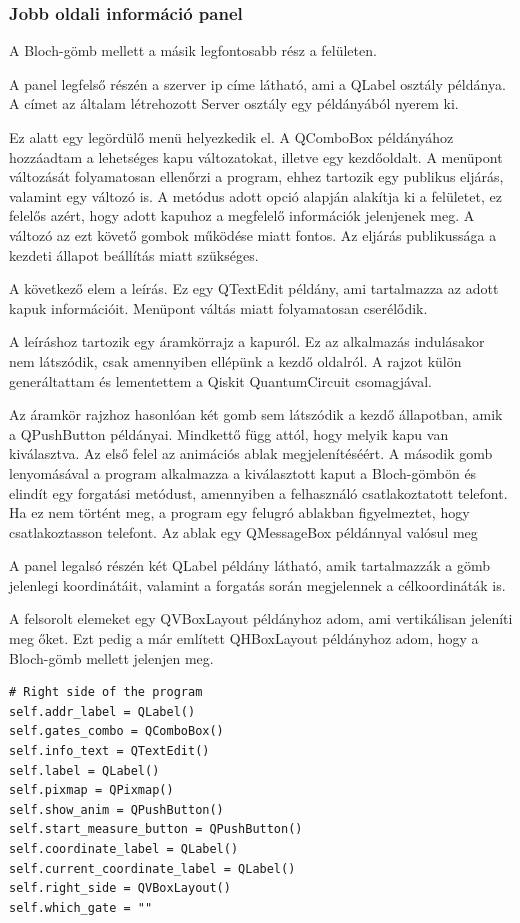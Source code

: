 \documentclass[
]{thesis-ekf}
\theoremstyle{definition}
\theoremstyle{remark}
\begin{document}
\subsubsection{Jobb oldali információ panel}
A Bloch-gömb mellett a másik legfontosabb rész a felületen.

A panel legfelső részén a szerver ip címe látható, ami a QLabel osztály példánya. A címet az általam létrehozott Server osztály egy példányából nyerem ki.

Ez alatt egy legördülő menü helyezkedik el. A QComboBox példányához hozzáadtam a lehetséges kapu változatokat, illetve egy kezdőoldalt. A menüpont változását folyamatosan ellenőrzi a program, ehhez tartozik egy publikus eljárás, valamint egy változó is. A metódus adott opció alapján alakítja ki a felületet, ez felelős azért, hogy adott kapuhoz a megfelelő információk jelenjenek meg. A változó az ezt követő gombok működése miatt fontos. Az eljárás publikussága a kezdeti állapot beállítás miatt szükséges.

A következő elem a leírás. Ez egy QTextEdit példány, ami tartalmazza az adott kapuk információit. Menüpont váltás miatt folyamatosan cserélődik.

A leíráshoz tartozik egy áramkörrajz a kapuról. Ez az alkalmazás indulásakor nem látszódik, csak amennyiben ellépünk a kezdő oldalról. A rajzot külön generáltattam és lementettem a Qiskit QuantumCircuit csomagjával.

Az áramkör rajzhoz hasonlóan két gomb sem látszódik a kezdő állapotban, amik a QPushButton példányai. Mindkettő függ attól, hogy melyik kapu van kiválasztva. Az első felel az animációs ablak megjelenítéséért. A második gomb lenyomásával a program alkalmazza a kiválasztott kaput a Bloch-gömbön és elindít egy forgatási metódust, amennyiben a felhasználó csatlakoztatott telefont. Ha ez nem történt meg, a program egy felugró ablakban figyelmeztet, hogy csatlakoztasson telefont. Az ablak egy QMessageBox példánnyal valósul meg

A panel legalsó részén két QLabel példány látható, amik tartalmazzák a gömb jelenlegi koordinátáit, valamint a forgatás során megjelennek a célkoordináták is.

A felsorolt elemeket egy QVBoxLayout példányhoz adom, ami vertikálisan jeleníti meg őket. Ezt pedig a már említett QHBoxLayout példányhoz adom, hogy a Bloch-gömb mellett jelenjen meg.

\begin{lstlisting}[caption={A jobb oldali panel és elemeinek létrehozása a konstruktorban}]
# Right side of the program
self.addr_label = QLabel()
self.gates_combo = QComboBox()
self.info_text = QTextEdit()
self.label = QLabel()
self.pixmap = QPixmap()
self.show_anim = QPushButton()
self.start_measure_button = QPushButton()
self.coordinate_label = QLabel()
self.current_coordinate_label = QLabel()
self.right_side = QVBoxLayout()
self.which_gate = ""
\end{lstlisting}
\end{document}
